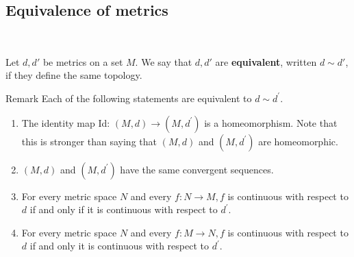 \documentclass[a4paper,11pt]{article}
\begin{document}
\subsection{Equivalence of metrics}\ \vspace{-1.5em}
\begin{definition}
	Let \( d, d' \) be metrics on a set \( M \).
	We say that \( d, d' \) are \textbf{equivalent}, written \( d \sim d' \), if they define the same topology.
\end{definition}

\begin{remark}
	Remark Each of the following statements are equivalent to $d \sim d^{\prime}$.
\begin{enumerate}
    \item The identity map Id: $(M, d) \rightarrow\left(M, d^{\prime}\right)$ is a homeomorphism. Note that this is stronger than saying that $(M, d)$ and $\left(M, d^{\prime}\right)$ are homeomorphic.
    \item $(M, d)$ and $\left(M, d^{\prime}\right)$ have the same convergent sequences.
    \item For every metric space $N$ and every $f: N \rightarrow M, f$ is continuous with respect to $d$ if and only if it is continuous with respect to $d^{\prime}$.
    \item For every metric space $N$ and every $f: M \rightarrow N, f$ is continuous with respect to $d$ if and only it is continuous with respect to $d^{\prime}$.
\end{enumerate}
\end{remark}
\end{document}
